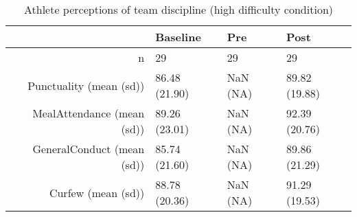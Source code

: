 \begin{table}[ht]
\centering
\begin{tabular}{rlll}
  \hline
 & Baseline & Pre & Post \\ 
  \hline
n &    29 &  29 &    29 \\ 
  Punctuality (mean (sd)) & 86.48 (21.90) & NaN (NA) & 89.82 (19.88) \\ 
  MealAttendance (mean (sd)) & 89.26 (23.01) & NaN (NA) & 92.39 (20.76) \\ 
  GeneralConduct (mean (sd)) & 85.74 (21.60) & NaN (NA) & 89.86 (21.29) \\ 
  Curfew (mean (sd)) & 88.78 (20.36) & NaN (NA) & 91.29 (19.53) \\ 
   \hline
\end{tabular}
\caption{Athlete perceptions of 
 team discipline (high difficulty condition)} 
\end{table}
